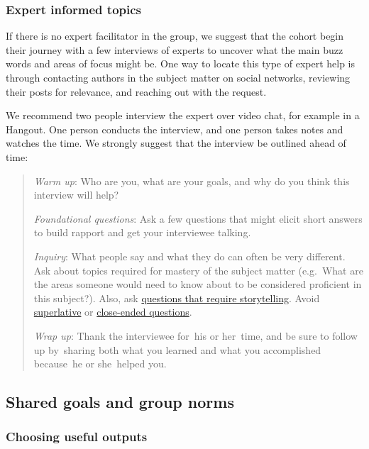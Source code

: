 \subsubsection{Expert informed topics}\label{expert-informed-topics}

If there is no expert facilitator in the group, we suggest that the
cohort begin their journey with a few interviews of experts to uncover
what the main buzz words and areas of focus might be. One way to locate
this type of expert help is through contacting authors in the subject
matter on social networks, reviewing their posts for relevance, and
reaching out with the request.

We recommend two people interview the expert over video chat, for
example in a Hangout. One person conducts the interview, and one person
takes notes and watches the time. We strongly suggest that the interview
be outlined ahead of time:

\begin{quote}
\emph{Warm up}: Who are you, what are your goals, and why do you think
this interview will help?

\emph{Foundational questions}: Ask a few questions that might elicit
short answers to build rapport and get your interviewee talking.

\emph{Inquiry}: What people say and what they do can often be very
different. Ask about topics required for mastery of the subject matter
(e.g.~What are the areas someone would need to know about to be
considered proficient in this subject?). Also, ask
\href{http://en.wikipedia.org/wiki/Critical_Incident_Technique}{questions
that require storytelling}. Avoid
\href{http://en.wikipedia.org/wiki/Superlative}{superlative} or
\href{http://en.wikipedia.org/wiki/Closed-ended_question}{close-ended
questions}.

\emph{Wrap up}: Thank the interviewee for~his or her~time, and be sure
to follow up by~sharing both what you learned and what you accomplished
because~he or she~helped you.
\end{quote}

\subsection{Shared goals and group
norms}\label{shared-goals-and-group-norms}

\subsubsection{Choosing useful outputs}\label{choosing-useful-outputs}

